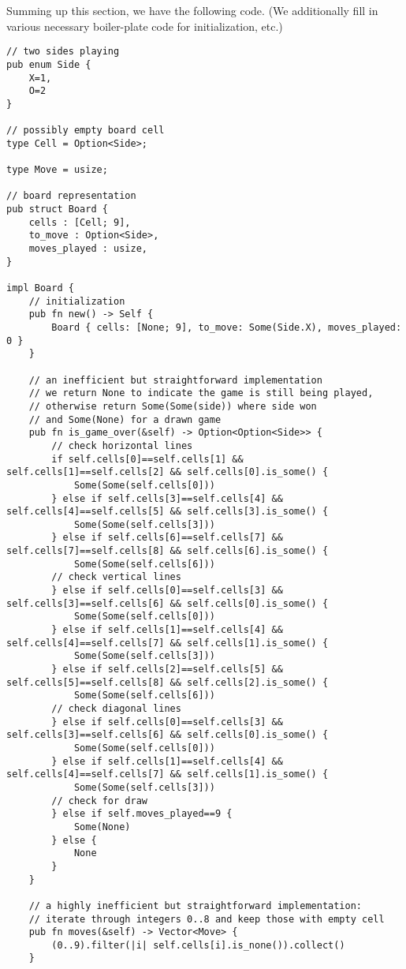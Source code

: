 \documentclass[10pt,dvipdfmx]{report}
\begin{document}
Summing up this section, we have the following code.
(We additionally fill in various necessary boiler-plate code for initialization, etc.)
{\small
\begin{verbatim}
// two sides playing
pub enum Side {
    X=1,
    O=2
}

// possibly empty board cell
type Cell = Option<Side>;

type Move = usize;

// board representation
pub struct Board {
    cells : [Cell; 9],
    to_move : Option<Side>,
    moves_played : usize,
}

impl Board {
    // initialization
    pub fn new() -> Self {
        Board { cells: [None; 9], to_move: Some(Side.X), moves_played: 0 }
    }

    // an inefficient but straightforward implementation
    // we return None to indicate the game is still being played,
    // otherwise return Some(Some(side)) where side won
    // and Some(None) for a drawn game
    pub fn is_game_over(&self) -> Option<Option<Side>> {
        // check horizontal lines
        if self.cells[0]==self.cells[1] && self.cells[1]==self.cells[2] && self.cells[0].is_some() {
            Some(Some(self.cells[0]))
        } else if self.cells[3]==self.cells[4] && self.cells[4]==self.cells[5] && self.cells[3].is_some() {
            Some(Some(self.cells[3]))
        } else if self.cells[6]==self.cells[7] && self.cells[7]==self.cells[8] && self.cells[6].is_some() {
            Some(Some(self.cells[6]))
        // check vertical lines
        } else if self.cells[0]==self.cells[3] && self.cells[3]==self.cells[6] && self.cells[0].is_some() {
            Some(Some(self.cells[0]))
        } else if self.cells[1]==self.cells[4] && self.cells[4]==self.cells[7] && self.cells[1].is_some() {
            Some(Some(self.cells[3]))
        } else if self.cells[2]==self.cells[5] && self.cells[5]==self.cells[8] && self.cells[2].is_some() {
            Some(Some(self.cells[6]))
        // check diagonal lines
        } else if self.cells[0]==self.cells[3] && self.cells[3]==self.cells[6] && self.cells[0].is_some() {
            Some(Some(self.cells[0]))
        } else if self.cells[1]==self.cells[4] && self.cells[4]==self.cells[7] && self.cells[1].is_some() {
            Some(Some(self.cells[3]))
        // check for draw
        } else if self.moves_played==9 {
            Some(None)
        } else {
            None
        }
    }

    // a highly inefficient but straightforward implementation:
    // iterate through integers 0..8 and keep those with empty cell
    pub fn moves(&self) -> Vector<Move> {
        (0..9).filter(|i| self.cells[i].is_none()).collect()
    }


\end{verbatim}}
\end{document}
